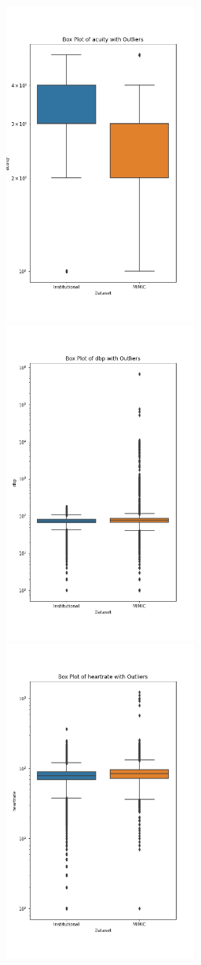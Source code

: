 \documentclass[pmlr]{jmlr}%
\begin{document}
\begin{figure}[h!]
   \centering 
   \includegraphics[width=2.5in]{plots/acuity_triage_boxplot.png} 
   \includegraphics[width=2.5in]{plots/dbp_triage_boxplot.png} 
   \includegraphics[width=2.5in]{plots/heartrate_triage_boxplot.png} 

\end{figure}
\end{document}
